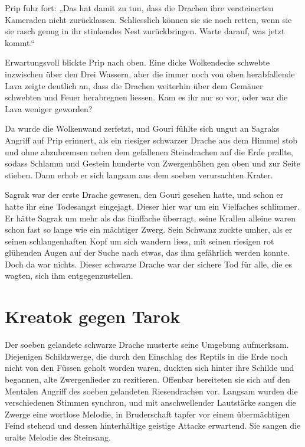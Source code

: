 \documentclass[10pt, a4paper, oneside]{book}
\begin{document}
Prip fuhr fort: „Das hat damit zu tun, dass die Drachen ihre versteinerten Kameraden nicht zurücklassen. Schliesslich können sie sie noch retten, wenn sie sie rasch genug in ihr stinkendes Nest zurückbringen. Warte darauf, was jetzt kommt.“

Erwartungsvoll blickte Prip nach oben. Eine dicke Wolkendecke schwebte inzwischen über den Drei Wassern, aber die immer noch von oben herabfallende Lava zeigte deutlich an, dass die Drachen weiterhin über dem Gemäuer schwebten und Feuer herabregnen liessen. Kam es ihr nur so vor, oder war die Lava weniger geworden?

Da wurde die Wolkenwand zerfetzt, und Gouri fühlte sich ungut an Sagraks Angriff auf Prip erinnert, als ein riesiger schwarzer Drache aus dem Himmel stob und ohne abzubremsen neben dem gefallenen Steindrachen auf die Erde prallte, sodass Schlamm und Gestein hunderte von Zwergenhöhen gen oben und zur Seite stieben. Dann erhob er sich langsam aus dem soeben verursachten Krater.

Sagrak war der erste Drache gewesen, den Gouri gesehen hatte, und schon er hatte ihr eine Todesangst eingejagt. Dieser hier war um ein Vielfaches schlimmer. Er hätte Sagrak um mehr als das fünffache überragt, seine Krallen alleine waren schon fast so lange wie ein mächtiger Zwerg. Sein Schwanz zuckte umher, als er seinen schlangenhaften Kopf um sich wandern liess, mit seinen riesigen rot glühenden Augen auf der Suche nach etwas, das ihm gefährlich werden konnte. Doch da war nichts. Dieser schwarze Drache war der sichere Tod für alle, die es wagten, sich ihm entgegenzustellen.


\newpage
\section{Kreatok gegen Tarok}

Der soeben gelandete schwarze Drache musterte seine Umgebung aufmerksam. Diejenigen Schildzwerge, die durch den Einschlag des Reptils in die Erde noch nicht von den Füssen geholt worden waren, duckten sich hinter ihre Schilde und begannen, alte Zwergenlieder zu rezitieren. Offenbar bereiteten sie sich auf den Mentalen Angriff des soeben gelandeten Riesendrachen vor. Langsam wurden die verschiedenen Stimmen synchron, und mit anschwellender Lautstärke sangen die Zwerge eine wortlose Melodie, in Bruderschaft tapfer vor einem übermächtigen Feind stehend und dessen hinterhältige geistige Attacke erwartend. Sie sangen die uralte Melodie des Steinsang.
\end{document}

